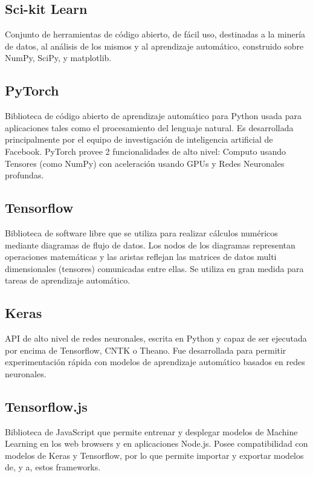 \documentclass[
11pt, %
oneside, %
spanish, %
singlespacing, %
headsepline, %
chapterinoneline, %
]{MastersDoctoralThesis} %
\begin{document}
\subsection{Sci-kit Learn \cite{sk}}
Conjunto de herramientas de código abierto, de fácil uso, destinadas a la minería de datos, al análisis de los mismos y al aprendizaje automático, construido sobre NumPy, SciPy, y matplotlib.

\subsection{PyTorch \cite{pyt}}
Biblioteca de código abierto de aprendizaje automático para Python usada para aplicaciones tales como el procesamiento del lenguaje natural. Es desarrollada principalmente por el equipo de investigación de inteligencia artificial de Facebook. PyTorch provee 2 funcionalidades de alto nivel: Computo usando Tensores (como NumPy) con aceleración usando GPUs y Redes Neuronales profundas.

\subsection{Tensorflow \cite{tf}}
Biblioteca de software libre que se utiliza para realizar cálculos numéricos mediante diagramas de flujo de datos. Los nodos de los diagramas representan operaciones matemáticas y las aristas reflejan las matrices de datos multi dimensionales (tensores) comunicadas entre ellas. Se utiliza en gran medida para tareas de aprendizaje automático.

\subsection{Keras \cite{ks}}
API de alto nivel de redes neuronales, escrita en Python y capaz de ser ejecutada por encima de Tensorflow, CNTK o Theano. Fue desarrollada para permitir experimentación rápida con modelos de aprendizaje automático basados en redes neuronales.

\subsection{Tensorflow.js \cite{tfjs}}
Biblioteca de JavaScript que permite entrenar y desplegar modelos de Machine Learning en los web browsers y en aplicaciones Node.js. Posee compatibilidad con modelos de Keras y Tensorflow, por lo que permite importar y exportar modelos de, y a, estos frameworks.
\end{document}
